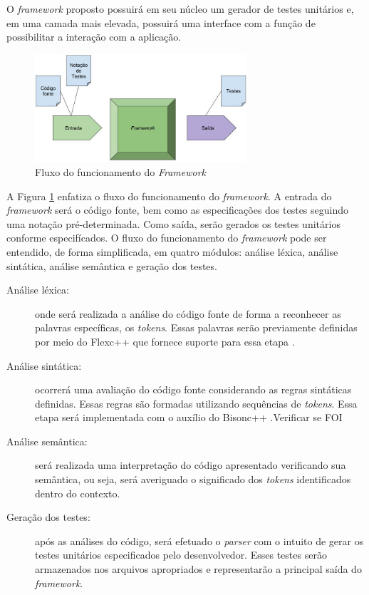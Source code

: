  \par
 \indent O \textit{framework} proposto possuirá em seu núcleo um gerador de testes unitários e, em uma camada mais elevada, possuirá uma interface com a função de possibilitar a interação com a aplicação. 
 
   \begin{figure}[h]
    \centering
    \includegraphics[width=0.7\textwidth]{figuras/entradasesaidas.jpg}
    \caption{Fluxo do funcionamento do \textit{Framework}}
    \label{fig:entradasesaidas}
 \end{figure}
 
 \par
\indent A Figura \ref{fig:entradasesaidas} enfatiza o fluxo do funcionamento do \textit{framework}. A entrada do \textit{framework} será o código fonte, bem como as especificações dos testes seguindo uma notação pré-determinada. Como saída, serão gerados os testes unitários conforme especifícados. O fluxo do funcionamento do \textit{framework} pode ser entendido, de forma simplificada, em quatro módulos: análise léxica, análise sintática, análise semântica e geração dos testes. 
 \begin{description}
 \item[Análise léxica:] onde será realizada a análise do código fonte de forma a reconhecer as palavras específicas, os \textit{tokens}. Essas palavras serão previamente definidas por meio do Flexc++ que fornece suporte para essa etapa \cite{flexcpp2015}.
 \item[Análise sintática:] ocorrerá uma avaliação do código fonte considerando as regras sintáticas definidas. Essas regras são formadas utilizando sequências de \textit{tokens}. Essa etapa será implementada com o auxílio do Bisonc++ \cite{bisoncpp2015}.Verificar se FOI
 \item[Análise semântica:] será realizada uma interpretação do código apresentado verificando sua semântica, ou seja, será averiguado o significado dos \textit{tokens} identificados dentro do contexto.
  \item[Geração dos testes:] após as análises do código, será efetuado o \textit{parser} com o intuito de gerar os testes unitários especificados pelo desenvolvedor. Esses testes serão armazenados nos arquivos apropriados e representarão a principal saída do \textit{framework}.
 \end{description}
 
